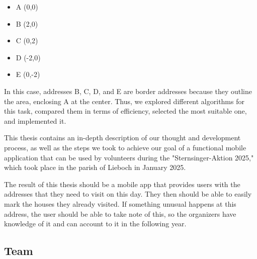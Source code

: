     \begin{itemize}
        \item A (0,0)
        \item B (2,0)
        \item C (0,2)
        \item D (-2,0)
        \item E (0,-2)
    \end{itemize}


In this case, addresses B, C, D, and E are border addresses because they outline the area, enclosing A at the center.
 Thus, we explored different algorithms for this task, compared them in terms of efficiency, selected the most suitable one, and implemented it.

\blankLine

This thesis contains an in-depth description of our thought and development process, as well as the steps we took to achieve our goal of a functional mobile application that can be used by volunteers during the "Sternsinger-Aktion 2025," which took place in the parish of Lieboch in January 2025.

\blankLine

The result of this thesis should be a mobile app that provides users with the addresses that they need to visit on this day. They then should be able to easily mark the houses they already visited. If something unusual happens at this address, the user should be able to take note of this, so the organizers have knowledge of it and can account to it in the following year.

\newpage

\subsection{Team}

